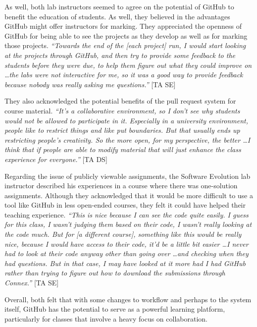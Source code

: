 As well, both lab instructors seemed to agree on the potential of GitHub to benefit the education of students. As well, they believed in the advantages GitHub might offer instructors for marking. They appreciated the openness of GitHub for being able to see the projects as they develop as well as for marking those projects. \textit{``Towards the end of the [each project] run, I would start looking at the projects through GitHub, and then try to provide some feedback to the students before they were due, to help them figure out what they could improve on \ldots the labs were not interactive for me, so it was a good way to provide feedback because nobody was really asking me questions.''} [TA SE]

They also acknowledged the potential benefits of the pull request system for course material. \textit{``It's a collaborative environment, so I don't see why students would not be allowed to participate in it. Especially in a university environment, people like to restrict things and like put boundaries. But that usually ends up restricting people's creativity. So the more open, for my perspective, the better \ldots I think that if people are able to modify material that will just enhance the class experience for everyone.''} [TA DS]

Regarding the issue of publicly viewable assignments, the Software Evolution lab instructor described his experiences in a course where there was one-solution assignments. Although they acknowledged that it would be more difficult to use a tool like GitHub in less open-ended courses, they felt it could have helped their teaching experience. \textit{``This is nice because I can see the code quite easily. I guess for this class, I wasn't judging them based on their code, I wasn't really looking at the code much. But for [a different course], something like this would be really nice, because I would have access to their code, it'd be a little bit easier \ldots I never had to look at their code anyway other than going over \ldots and checking when they had questions. But in that case, I may have looked at it more had I had GitHub rather than trying to figure out how to download the submissions through Connex.''} [TA SE]

Overall, both felt that with some changes to workflow and perhaps to the system itself, GitHub has the potential to serve as a powerful learning platform, particularly for classes that involve a heavy focus on collaboration.


